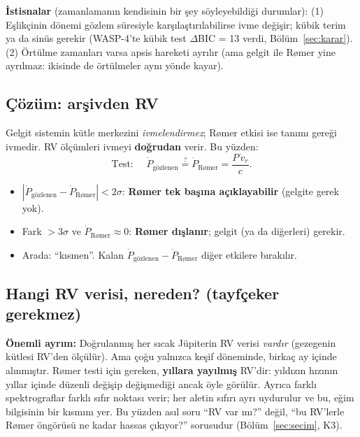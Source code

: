 \textbf{İstisnalar} (zamanlamanın kendisinin bir şey söyleyebildiği durumlar):
(1) Eşlikçinin dönemi gözlem süresiyle karşılaştırılabilirse ivme değişir; kübik terim ya da sinüs gerekir
(WASP-4'te kübik test $\Delta$BIC = 13 verdi, Bölüm~\ref{sec:karar}).
(2) Örtülme zamanları varsa apsis hareketi ayrılır (ama gelgit ile Rømer yine ayrılmaz: ikisinde de örtülmeler aynı yönde kayar).

\subsection{Çözüm: arşivden RV}
Gelgit sistemin kütle merkezini \emph{ivmelendirmez}; Rømer etkisi ise tanımı gereği ivmedir. RV ölçümleri ivmeyi
\textbf{doğrudan} verir. Bu yüzden:
\[
\text{Test: } \quad \dot P_\text{gözlenen} \overset{?}{=} \dot P_\text{Rømer} = \frac{P\,\dot v_r}{c} .
\]
\begin{itemize}[leftmargin=*]
\item $|\dot P_\text{gözlenen} - \dot P_\text{Rømer}| < 2\sigma$: \textbf{Rømer tek başına açıklayabilir} (gelgite gerek yok).
\item Fark $> 3\sigma$ ve $\dot P_\text{Rømer} \approx 0$: \textbf{Rømer dışlanır}; gelgit (ya da diğerleri) gerekir.
\item Arada: “kısmen”. Kalan $\dot P_\text{gözlenen} - \dot P_\text{Rømer}$ diğer etkilere bırakılır.
\end{itemize}

\subsection{Hangi RV verisi, nereden? (tayfçeker gerekmez)}
\textbf{Önemli ayrım:} Doğrulanmış her sıcak Jüpiterin RV verisi \emph{vardır} (gezegenin kütlesi RV'den ölçülür). Ama
çoğu yalnızca keşif döneminde, birkaç ay içinde alınmıştır. Rømer testi için gereken, \textbf{yıllara yayılmış} RV'dir:
yıldızın hızının yıllar içinde düzenli değişip değişmediği ancak öyle görülür. Ayrıca farklı spektrograflar farklı sıfır
noktası verir; her aletin sıfırı ayrı uydurulur ve bu, eğim bilgisinin bir kısmını yer. Bu yüzden asıl soru “RV var mı?”
değil, “bu RV'lerle Rømer öngörüsü ne kadar hassas çıkıyor?” sorusudur (Bölüm~\ref{sec:secim}, K3).

